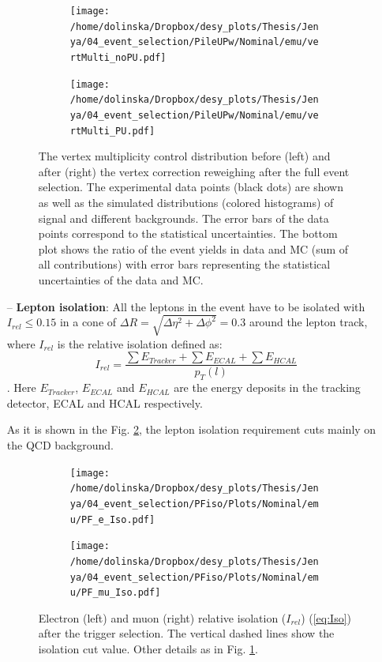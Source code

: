 \begin{itemize}
 \begin{figure}[h]
 \centering
 \begin{subfigure}
   \centering
   \texttt{[image: /home/dolinska/Dropbox/desy\_plots/Thesis/Jenya/04\_event\_selection/PileUPw/Nominal/emu/vertMulti\_noPU.pdf]}
 \end{subfigure}
 \begin{subfigure}
   \centering
   \texttt{[image: /home/dolinska/Dropbox/desy\_plots/Thesis/Jenya/04\_event\_selection/PileUPw/Nominal/emu/vertMulti\_PU.pdf]}
 \end{subfigure}
 \caption{The vertex multiplicity control distribution before (left) and after (right) the vertex correction reweighing after the full event selection.
  The experimental data points (black dots) are shown as well as the simulated distributions (colored histograms) of signal and different backgrounds. 
  The error bars of the data points correspond to the statistical uncertainties. The bottom plot shows the ratio of the event yields in data 
  and MC (sum of all contributions) with error bars representing the statistical uncertainties of the data and MC.}
 \label{fig:PUweight}
 \end{figure}
 
 \item [--] \textbf{Lepton isolation}: All the leptons in the event have to be isolated with $I_{rel}\leq 0.15$ in a cone of $\Delta R = \sqrt{\Delta\eta^{2} + \Delta\phi^{2}} = 0.3$ 
 around the lepton track, where $I_{rel}$ is the relative isolation defined as:
  \begin{equation}\label{eq:Iso}
   I_{rel} = \frac{\sum E_{Tracker} + \sum E_{ECAL} + \sum E_{HCAL}}{p_{T}(l)}
  \end{equation}.
 Here $E_{Tracker}$, $E_{ECAL}$ and $E_{HCAL}$ are the energy deposits in the tracking detector, ECAL and HCAL respectively.
 
 As it is shown in the Fig. \ref{fig:PFIso}, the lepton isolation requirement cuts mainly on the QCD background.

 \begin{figure}[h]
 \centering
 \begin{subfigure}
   \centering
   \texttt{[image: /home/dolinska/Dropbox/desy\_plots/Thesis/Jenya/04\_event\_selection/PFiso/Plots/Nominal/emu/PF\_e\_Iso.pdf]}
 \end{subfigure}
 \begin{subfigure}
   \centering
   \texttt{[image: /home/dolinska/Dropbox/desy\_plots/Thesis/Jenya/04\_event\_selection/PFiso/Plots/Nominal/emu/PF\_mu\_Iso.pdf]}
 \end{subfigure}
 \caption{Electron (left) and muon (right) relative isolation ($I_{rel}$) (\ref{eq:Iso}) after the trigger selection. The vertical dashed lines 
  show the isolation cut value. Other details as in Fig. \ref{fig:PUweight}.}
 \label{fig:PFIso}
 \end{figure}
 

\end{itemize}
